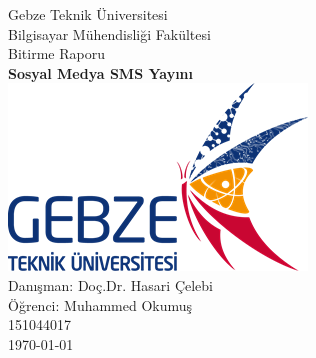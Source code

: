 \documentclass[12pt]{article}
\begin{document}


\begin{center}
\thispagestyle{empty}
{\LARGE Gebze Teknik Üniversitesi}\\[.5cm]
{\Large Bilgisayar Mühendisliği Fakültesi}\\[3cm]
{\linespread{1.2} {\Large Bitirme Raporu}}\\[0.5cm]
{\huge \bfseries Sosyal Medya SMS Yayını}\\[1.5cm]
\linespread{1}
\includegraphics{Report/images/gebze_logo.png}\\
\vspace{\fill}
{\Large Danışman: Doç.Dr. Hasari Çelebi}\\[0.5cm]
{\Large Öğrenci: Muhammed Okumuş}\\[0.5cm]
{\Large 151044017}\\[0.5cm]
{\Large \today}
\end{center}

\clearpage
{}

\newpage

\tableofcontents

\newpage





\newpage




\newpage

 


\newpage
\end{document}
